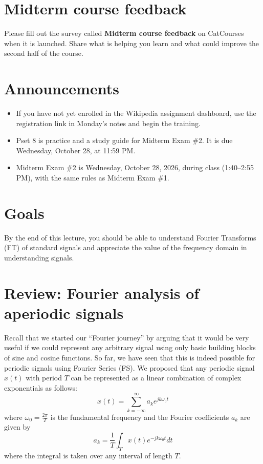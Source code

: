 \section{Midterm course feedback}
Please fill out the survey called \textbf{Midterm course feedback} on
CatCourses when it is launched. Share what is helping you learn and what
could improve the second half of the course.

\section{Announcements}
\begin{itemize}
    \item If you have not yet enrolled in the Wikipedia assignment dashboard,
    use the registration link in Monday's notes and begin the training.
    \item Pset 8 is practice and a study guide for Midterm Exam \#2.
    It is due Wednesday, October 28, at 11:59 PM.
    \item Midterm Exam \#2 is Wednesday, October 28, 2026, during class
    (1:40--2:55 PM), with the same rules as Midterm Exam \#1.
\end{itemize}

\section{Goals}

By the end of this lecture, you should be able to understand Fourier Transforms (FT) of standard signals and appreciate the value of the frequency domain in understanding signals.

\section{Review: Fourier analysis of aperiodic signals}
Recall that we started our ``Fourier journey'' by arguing that it would be very useful if we could represent any arbitrary signal using only basic building blocks of sine and cosine functions. So far, we have seen that this is indeed possible for periodic signals using Fourier Series (FS). We proposed that any periodic signal $x(t)$ with period $T$ can be represented as a linear combination of complex exponentials as follows:
\begin{equation} 
  \label{eq:fs_synthesis}
  x(t) = \sum_{k=-\infty}^{\infty} a_k e^{jk\omega_0 t}
\end{equation}
where $\omega_0 = \frac{2\pi}{T}$ is the fundamental frequency and the Fourier coefficients $a_k$ are given by
\begin{equation}
  \label{eq:fs_analysis}
  a_k = \frac{1}{T} \int_{T} x(t) e^{-jk\omega_0 t} dt
\end{equation}
where the integral is taken over any interval of length $T$.

